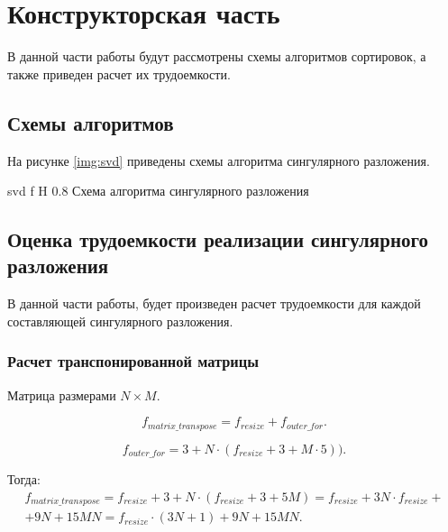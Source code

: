 \chapter{Конструкторская часть}
В данной части работы будут рассмотрены схемы алгоритмов сортировок, а также приведен расчет их трудоемкости.





\section{Схемы алгоритмов}
На рисунке \ref{img:svd} приведены схемы алгоритма сингулярного разложения.

{svd} %
{f} %
{H} %
{0.8\textwidth} %
{Схема алгоритма сингулярного разложения} %






\section{Оценка трудоемкости реализации сингулярного разложения}
В данной части работы, будет произведен расчет трудоемкости для каждой составляющей сингулярного разложения.
\subsection{Расчет транспонированной матрицы}
Матрица размерами $N \times M$.

\begin{equation}
	f_{matrix\_transpose} = f_{resize} + f_{outer\_for}.
\end{equation}

\begin{equation}
	f_{outer\_for} = 3 + N \cdot (f_{resize} + 3 + M \cdot 5)).
\end{equation}

Тогда:
\begin{equation}
	\begin{gathered}
		f_{matrix\_transpose} = f_{resize} + 3 + N \cdot (f_{resize} + 3 + 5M) = f_{resize} + 3N \cdot f_{resize} + \\ + 9N + 15MN= f_{resize} \cdot (3N + 1) + 9N + 15MN.
	\end{gathered}
\end{equation}

